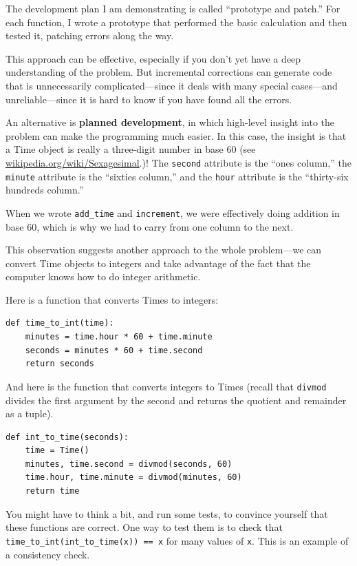 \documentclass[10pt]{book}
\begin{document}
{

The development plan I am demonstrating is called ``prototype and
patch.''  For each function, I wrote a prototype that performed the
basic calculation and then tested it, patching errors along the
way.

This approach can be effective, especially if you don't yet have a
deep understanding of the problem.  But incremental corrections can
generate code that is unnecessarily complicated---since it deals with
many special cases---and unreliable---since it is hard to know if you
have found all the errors.

An alternative is {\bf planned development}, in which high-level
insight into the problem can make the programming much easier.  In
this case, the insight is that a Time object is really a three-digit
number in base 60 (see \url{wikipedia.org/wiki/Sexagesimal}.)!  The
{\tt second} attribute is the ``ones column,'' the {\tt minute}
attribute is the ``sixties column,'' and the {\tt hour} attribute is
the ``thirty-six hundreds column.''


When we wrote \verb"add_time" and {\tt increment}, we were effectively
doing addition in base 60, which is why we had to carry from one
column to the next.


This observation suggests another approach to the whole problem---we
can convert Time objects to integers and take advantage of the fact
that the computer knows how to do integer arithmetic.  

Here is a function that converts Times to integers:

\beforeverb
\begin{verbatim}
def time_to_int(time):
    minutes = time.hour * 60 + time.minute
    seconds = minutes * 60 + time.second
    return seconds
\end{verbatim}
\afterverb
%
And here is the function that converts integers to Times
(recall that {\tt divmod} divides the first argument by the second
and returns the quotient and remainder as a tuple).


\beforeverb
\begin{verbatim}
def int_to_time(seconds):
    time = Time()
    minutes, time.second = divmod(seconds, 60)
    time.hour, time.minute = divmod(minutes, 60)
    return time
\end{verbatim}
\afterverb
%
You might have to think a bit, and run some tests, to convince
yourself that these functions are correct.  One way to test them is to
check that \verb"time_to_int(int_to_time(x)) == x" for many values of
{\tt x}.  This is an example of a consistency check.

}
\end{document}
